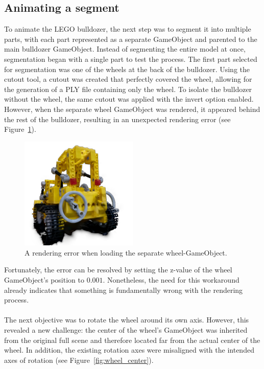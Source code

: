 \documentclass[12pt]{article}
\begin{document}
\subsection{Animating a segment}
To animate the LEGO bulldozer, the next step was to segment it into multiple parts, with each part represented as a separate GameObject and parented to the main bulldozer GameObject. Instead of segmenting the entire model at once, segmentation began with a single part to test the process. The first part selected for segmentation was one of the wheels at the back of the bulldozer. Using the cutout tool, a cutout was created that perfectly covered the wheel, allowing for the generation of a PLY file containing only the wheel. To isolate the bulldozer without the wheel, the same cutout was applied with the invert option enabled. However, when the separate wheel GameObject was rendered, it appeared behind the rest of the bulldozer, resulting in an unexpected rendering error (see Figure~\ref{fig:firstwheel}).
\begin{figure}[h!]
	\centering
	\includegraphics[width=0.5\textwidth]{Images/first_wheel.png}
	\caption{A rendering error when loading the separate wheel-GameObject.}
	\label{fig:firstwheel}
\end{figure}
\FloatBarrier
\noindent
Fortunately, the error can be resolved by setting the z-value of the wheel GameObject’s position to $0.001$. Nonetheless, the need for this workaround already indicates that something is fundamentally wrong with the rendering process.
\\\\
The next objective was to rotate the wheel around its own axis. However, this revealed a new challenge: the center of the wheel’s GameObject was inherited from the original full scene and therefore located far from the actual center of the wheel. In addition, the existing rotation axes were misaligned with the intended axes of rotation (see Figure~\ref{fig:wheel_center}).
\end{document}
